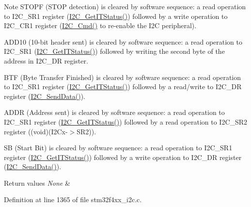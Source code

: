 \begin{DoxyNote}{Note}
S\-T\-O\-P\-F (S\-T\-O\-P detection) is cleared by software sequence\-: a read operation to I2\-C\-\_\-\-S\-R1 register (\hyperlink{group___i2_c_ga447771fbbd94a56f3570b9f430a069ba}{I2\-C\-\_\-\-Get\-I\-T\-Status()}) followed by a write operation to I2\-C\-\_\-\-C\-R1 register (\hyperlink{group___i2_c_ga7e1323c9133c2cb424dfb5b10b7d2f0b}{I2\-C\-\_\-\-Cmd()} to re-\/enable the I2\-C peripheral). 

A\-D\-D10 (10-\/bit header sent) is cleared by software sequence\-: a read operation to I2\-C\-\_\-\-S\-R1 (\hyperlink{group___i2_c_ga447771fbbd94a56f3570b9f430a069ba}{I2\-C\-\_\-\-Get\-I\-T\-Status()}) followed by writing the second byte of the address in I2\-C\-\_\-\-D\-R register. 

B\-T\-F (Byte Transfer Finished) is cleared by software sequence\-: a read operation to I2\-C\-\_\-\-S\-R1 register (\hyperlink{group___i2_c_ga447771fbbd94a56f3570b9f430a069ba}{I2\-C\-\_\-\-Get\-I\-T\-Status()}) followed by a read/write to I2\-C\-\_\-\-D\-R register (\hyperlink{group___i2_c_ga7bd9e70b8eafde0dd5eb42b0d95fe1a9}{I2\-C\-\_\-\-Send\-Data()}). 

A\-D\-D\-R (Address sent) is cleared by software sequence\-: a read operation to I2\-C\-\_\-\-S\-R1 register (\hyperlink{group___i2_c_ga447771fbbd94a56f3570b9f430a069ba}{I2\-C\-\_\-\-Get\-I\-T\-Status()}) followed by a read operation to I2\-C\-\_\-\-S\-R2 register ((void)(I2\-Cx-\/$>$S\-R2)). 

S\-B (Start Bit) is cleared by software sequence\-: a read operation to I2\-C\-\_\-\-S\-R1 register (\hyperlink{group___i2_c_ga447771fbbd94a56f3570b9f430a069ba}{I2\-C\-\_\-\-Get\-I\-T\-Status()}) followed by a write operation to I2\-C\-\_\-\-D\-R register (\hyperlink{group___i2_c_ga7bd9e70b8eafde0dd5eb42b0d95fe1a9}{I2\-C\-\_\-\-Send\-Data()}). 
\end{DoxyNote}

\begin{DoxyRetVals}{Return values}
{\em None} & \\
\hline
\end{DoxyRetVals}


Definition at line 1365 of file stm32f4xx\-\_\-i2c.\-c.

